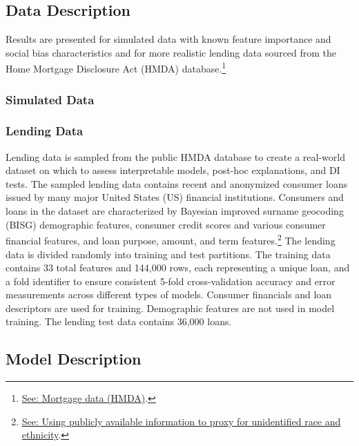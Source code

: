 \documentclass[information,article,submit,moreauthors,pdftex]{definitions/mdpi}
\begin{document}
\subsection{Data Description}\label{ssec:data}

Results are presented for simulated data with known feature importance and social bias characteristics and for more realistic lending data sourced from the Home Mortgage Disclosure Act (HMDA) database.\footnote{\href{https://www.consumerfinance.gov/data-research/hmda/}{See: Mortgage data (HMDA)}.}

\subsubsection{Simulated Data}

\subsubsection{Lending Data}

Lending data is sampled from the public HMDA database to create a real-world dataset on which to assess interpretable models, post-hoc explanations, and DI tests. The sampled lending data contains recent and anonymized consumer loans issued by many major United States (US) financial institutions. Consumers and loans in the dataset are characterized by Bayesian improved surname geocoding (BISG) demographic features, consumer credit scores and various consumer financial features, and loan purpose, amount, and term features.\footnote{\href{https://files.consumerfinance.gov/f/201409_cfpb_report_proxy-methodology.pdf}{See: Using publicly available information to proxy for unidentified race and ethnicity}.} The lending data is divided randomly into training and test partitions. The training data contains 33 total features and 144,000 rows, each representing a unique loan, and a fold identifier to ensure consistent 5-fold cross-validation accuracy and error measurements across different types of models. Consumer financials and loan descriptors are used for training. Demographic features are not used in model training. The lending test data contains 36,000 loans.


\subsection{Model Description}\label{ssec:models}
\end{document}
